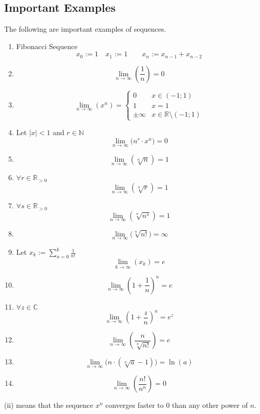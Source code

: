 \subsection{Important Examples}
\begin{proposition}
   The following are important examples of sequences.

   \begin{enumerate}[label=\roman*, align=Center]
      \item Fibonacci Sequence
         \[x_0 := 1 \quad x_1 := 1 \qquad x_{n} := x_{n-1} + x_{n-2}\]
      \item \[\lim_{n \to \infty} \left(\frac{1}{n}\right) = 0\]
      \item \[\lim_{n \to \infty}(x^n) = \begin{cases}
               0 & x \in (-1; 1)\\
               1 & x = 1\\
               \pm\infty & x \in \mathbb{R}\setminus (-1;1)
         \end{cases}\]
      \item Let \(|x| < 1\) and \(r \in \mathbb{N}\)
         \[\lim_{n \to \infty}\big(n^r \cdot x^n\big) = 0\]
      \item \[\lim_{n \to \infty}(\sqrt[n]{n}) = 1\]
      \item \(\forall r \in \mathbb{R}_{>0}\)
         \[\lim_{n \to \infty}(\sqrt[n]{r}) = 1\]
      \item \(\forall s \in \mathbb{R}_{>0}\)
         \[\lim_{n \to \infty}(\sqrt[n]{n^s}) = 1\]
      \item \[\lim_{n \to \infty}\big(\sqrt[n]{n!}\big) = \infty\]
      \item Let \(x_k := \sum_{n=0}^k \frac{1}{n!}\)
         \[\lim_{k \to \infty}(x_k) = e\]
      \item \[\lim_{n \to \infty}\left(1 + \frac{1}{n}\right)^n = e\]
      \item \(\forall z \in \mathbb{C}\)
         \[\lim_{n \to \infty}\left(1 + \frac{z}{n}\right)^n = e^z\]
      \item \[\lim_{n \to \infty}\left(\frac{n}{\sqrt[n]{n!}}\right) = e\]
      \item \[\lim_{n \to \infty}\big(n \cdot (\sqrt[n]{a} - 1)\big) = \ln(a)\]
      \item
         \[\lim_{n \to \infty}\left(\frac{n!}{n^n}\right) = 0\]
   \end{enumerate}
\end{proposition}
\begin{remark}
   (ii) means that the sequence \(x^n\) converges faster to 0 than any other power of \(n\).
\end{remark}
